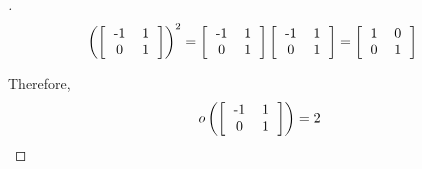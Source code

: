 \documentclass[paper=usletter, fontsize=12pt]{article}
\begin{document}
\begin{itemize}
\begin{itemize}
\begin{enumerate}
\begin{proof}[\unskip\nopunct]
                    \begingroup
                    \addtolength{\jot}{1em}
                    \begin{align*}
                        \left(\left[
                            \begin{tabular}{cc}
                                -1 & 1 \\
                                0 & 1
                            \end{tabular}
                        \right]\right)^2 & =
                        \left[
                            \begin{tabular}{cc}
                                -1 & 1 \\
                                0 & 1
                            \end{tabular}
                        \right]
                        \left[
                            \begin{tabular}{cc}
                                -1 & 1 \\
                                0 & 1
                            \end{tabular}
                        \right] =
                        \left[
                            \begin{tabular}{cc}
                                1 & 0 \\
                                0 & 1
                            \end{tabular}
                        \right]
                    \end{align*}
                    \endgroup

                    Therefore,
                    \begin{equation*}
                    o\left(\left[
                            \begin{tabular}{cc}
                                -1 & 1 \\
                                0 & 1
                            \end{tabular}
                        \right]\right)=2 \qedhere
                    \end{equation*}

                \end{proof}
                \vspace{0.2in}

            \end{enumerate}


\end{itemize}
\end{itemize}
\end{document}
